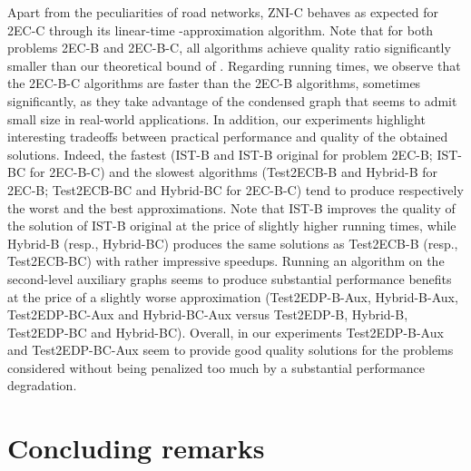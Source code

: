 \documentclass[11pt]{article}
\begin{document}
Apart from the peculiarities of road networks, \textsf{ZNI-C} behaves as expected for \textsf{2EC-C} through its linear-time -approximation algorithm.
Note that for both problems \textsf{2EC-B} and \textsf{2EC-B-C}, all algorithms achieve quality ratio significantly smaller than our theoretical bound of .
Regarding running times, we observe that the \textsf{2EC-B-C} algorithms are faster than the \textsf{2EC-B} algorithms, sometimes significantly, as
they take advantage of the condensed graph that seems to admit small size in real-world applications. In addition, our experiments highlight interesting tradeoffs between practical performance and quality of the obtained solutions.
Indeed, the fastest (\textsf{IST-B} and \textsf{IST-B original} for problem \textsf{2EC-B};
\textsf{IST-BC} for \textsf{2EC-B-C})
and the slowest algorithms (\textsf{Test2ECB-B} and \textsf{Hybrid-B} for \textsf{2EC-B};
\textsf{Test2ECB-BC} and \textsf{Hybrid-BC} for \textsf{2EC-B-C}) tend to produce respectively the worst and the best approximations.
Note that
\textsf{IST-B} improves the quality of the solution of \textsf{IST-B original} at the price of slightly higher running times, while \textsf{Hybrid-B} (resp., \textsf{Hybrid-BC}) produces the same solutions as \textsf{Test2ECB-B} (resp., \textsf{Test2ECB-BC}) with rather impressive speedups. Running an algorithm on the second-level auxiliary graphs seems to produce substantial performance benefits at the price of a slightly worse approximation (\textsf{Test2EDP-B-Aux}, \textsf{Hybrid-B-Aux}, \textsf{Test2EDP-BC-Aux} and \textsf{Hybrid-BC-Aux}  versus \textsf{Test2EDP-B}, \textsf{Hybrid-B}, \textsf{Test2EDP-BC} and \textsf{Hybrid-BC}).
Overall,
in our experiments \textsf{Test2EDP-B-Aux}
and \textsf{Test2EDP-BC-Aux} seem to provide
good quality solutions for the problems considered without being  penalized too much by a substantial performance degradation.


\section{Concluding remarks}
\label{sec:concluding}
\end{document}
